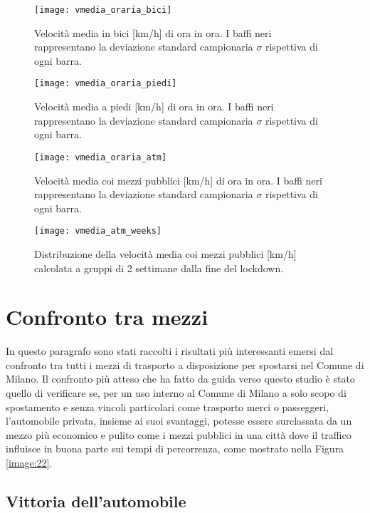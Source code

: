 \begin{figure}[H]
	\centering
	\texttt{[image: vmedia\_oraria\_bici]}
	\caption{Velocità media in bici [km/h] di ora in ora. I baffi neri rappresentano la deviazione standard campionaria $\sigma$ rispettiva di ogni barra.}
	\label{image:11}
\end{figure}

\begin{figure}[H]
	\centering
	\texttt{[image: vmedia\_oraria\_piedi]}
	\caption{Velocità media a piedi [km/h] di ora in ora. I baffi neri rappresentano la deviazione standard campionaria $\sigma$ rispettiva di ogni barra.}
	\label{image:18}
\end{figure}

\begin{figure}
\centering
\texttt{[image: vmedia\_oraria\_atm]}
\caption{Velocità media coi mezzi pubblici [km/h] di ora in ora. I baffi neri rappresentano la deviazione standard campionaria $\sigma$ rispettiva di ogni barra.}
\label{image:17}
\end{figure}

\begin{figure}
\centering
\texttt{[image: vmedia\_atm\_weeks]}
\caption{Distribuzione della velocità media coi mezzi pubblici [km/h] calcolata a gruppi di 2 settimane dalla fine del lockdown.}
\label{image:29}
\end{figure}


\section{Confronto tra mezzi}

In questo paragrafo sono stati raccolti i risultati più interessanti emersi dal confronto tra tutti i mezzi di trasporto a disposizione per spostarsi nel Comune di Milano. Il confronto più atteso che ha fatto da guida verso questo studio è stato quello di verificare se, per un uso interno al Comune di Milano a solo scopo di spostamento e senza vincoli particolari come trasporto merci o passeggeri, l'automobile privata, insieme ai suoi svantaggi, potesse essere surclassata da un mezzo più economico e pulito come i mezzi pubblici in una città dove il traffico influisce in buona parte sui tempi di percorrenza, come mostrato nella Figura \ref{image:22}.

\subsection{Vittoria dell'automobile}

